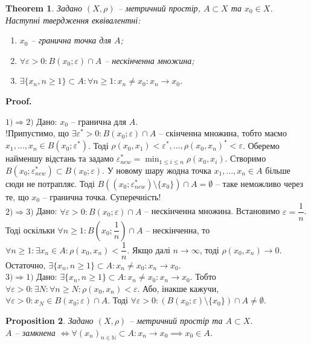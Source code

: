 \documentclass[a4paper, 10pt]{article}
\makeatletter
\theoremstyle{theoremdd}
\newtheorem{theorem}{Theorem}[subsection]
\theoremstyle{theoremdd}
\theoremstyle{theoremdd}
\theoremstyle{theoremdd}
\theoremstyle{theoremdd}
\newtheorem{proposition}[theorem]{Proposition}
\theoremstyle{theoremdd}
\theoremstyle{theoremdd}
\theoremstyle{theoremdd}
\renewenvironment{proof}[1][Proof.\\]{\par
\pushQED{\hfill \qed}%
\normalfont \topsep6\p@\@plus6\p@\relax
\trivlist
\item\relax
{\bfseries
#1\@addpunct{.}}\hspace\labelsep\ignorespaces
}{%
\popQED\endtrivlist\@endpefalse
}
\makeatother
\begin{document}
\begin{theorem}
Задано $(X,\rho)$ -- метричний простір, $A \subset X$ та $x_0 \in X$. Наступні твердження еквівалентні:
\begin{enumerate}[nosep,wide=0pt,label={\arabic*)}]
\item $x_0$ -- гранична точка для $A$;
\item $\forall \varepsilon > 0: B(x_0;\varepsilon) \cap A$ -- нескінченна множина;
\item $\exists \{x_n, n \geq 1\} \subset A: \forall n \geq 1: x_n \neq x_0: x_n \to x_0$.
\end{enumerate}
\end{theorem}

\begin{proof}
$\boxed{1) \Rightarrow 2)}$ Дано: $x_0$ -- гранична для $A$.\\
!Припустимо, що $\exists \varepsilon^* > 0: B(x_0;\varepsilon) \cap A$ -- скінченна множина, тобто маємо  $x_1,\dots,x_n \in B(x_0;\varepsilon^*)$. Тоді $\rho(x_0,x_1) < \varepsilon^*, \dots, \rho(x_0,x_n)^* < \varepsilon$. Оберемо найменшу відстань та задамо $\varepsilon^*_{new} = \displaystyle \min_{1\leq i \leq n} \rho(x_0,x_i)$. Створимо $B(x_0;\varepsilon^*_{new}) \subset B(x_0; \varepsilon)$. У новому шару жодна точка $x_1,\dots,x_n \in A$ більше сюди не потрапляє. Тоді $B((x_0;\varepsilon^*_{new}) \setminus \{x_0\}) \cap A = \emptyset$ -- таке неможливо через те, що $x_0$ -- гранична точка. Суперечність!
\bigskip \\
$\boxed{2) \Rightarrow 3)}$ Дано: $\forall \varepsilon > 0: B(x_0;\varepsilon) \cap A$ -- нескінченна множина. Встановимо $\varepsilon = \dfrac{1}{n}$. Тоді оскільки $\forall n \geq 1: B \left(x_0;\dfrac{1}{n} \right) \cap A$ -- нескінченна, то $\forall n \geq 1: \exists x_n \in A: \rho(x_0,x_n) < \dfrac{1}{n}$. Якщо далі $n \to \infty$, тоді $\rho(x_0,x_n) \to 0$. Остаточно, $\exists \{x_n, n \geq 1\} \subset A: x_n \neq x_0: x_n \to x_0$.
\bigskip \\
$\boxed{3) \Rightarrow 1)}$ Дано: $\exists \{x_n, n \geq 1\} \subset A: x_n \neq x_0: x_n \to x_0$. Тобто $\forall \varepsilon > 0: \exists N: \forall n \geq N: \rho(x_0,x_n) < \varepsilon$. Або, інакше кажучи, $\forall \varepsilon > 0: x_N \in B(x_0;\varepsilon) \cap A$. Тоді $\forall \varepsilon > 0: (B(x_0;\varepsilon) \setminus \{x_0\}) \cap A \neq \emptyset$.
\end{proof}

\begin{proposition}
\label{closed_iff_limit_of_sequence_in_closed_set}
Задано $(X,\rho)$ -- метричний простір та $A \subset X$.\\
$A$ -- замкнена $\iff \forall (x_n)_{n \in \mathbb{N}} \subset A: x_n \to x_0 \implies x_0 \in A$.
\end{proposition}
\end{document}
